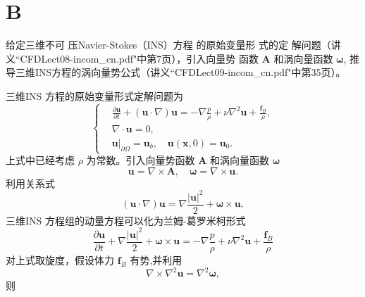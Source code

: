 \documentclass[12pt]{article}
\begin{document}
\section{B}

给定三维不可 压Navier-Stokes（INS）方程 的原始变量形 式的定
解问题（讲义“CFDLect08-incom_cn.pdf"中第7页），引入向量势
函数 $\bm{A}$ 和涡向量函数 $\bm{\omega}$, 推导三维INS方程的涡向量势公式（讲义“CFDLect09-incom_cn.pdf"中第35页）。

三维INS 方程的原始变量形式定解问题为
\begin{equation}
	\left\{\begin{aligned}
		 & \frac{\partial \bm{u}}{\partial t}+(\bm{u} \cdot \nabla) \bm{u}=-\nabla \frac{p}{\rho}+\nu \nabla^{2} \bm{u}+\frac{\bm{f}_{B}}{\rho}, \\
		 & \nabla \cdot \bm{u}=0,                                                                                                                \\
		 & \left.\bm{u}\right|_{\partial \Omega}=\bm{u}_{b}, \quad \bm{u}(\bm{x}, 0)=\bm{u}_{0} .
	\end{aligned}\right.
\end{equation}
上式中已经考虑 $\rho$ 为常数。引入向量势函数 $\bm{A}$ 和涡向量函数 $\bm{\omega}$
\begin{equation}
	\bm{u}=\nabla \times \bm{A}, \quad \bm{\omega}=\nabla \times \bm{u}.
\end{equation}
利用关系式
\begin{equation}
	(\bm{u} \cdot \nabla) \bm{u}=\nabla \frac{|\bm{u}|^{2}}{2}+\bm{\omega} \times \bm{u},
\end{equation}
三维INS 方程组的动量方程可以化为兰姆-葛罗米柯形式
\begin{equation}
	\frac{\partial \bm{u}}{\partial t}+\nabla \frac{|\bm{u}|^{2}}{2}+\bm{\omega} \times \bm{u}=-\nabla \frac{p}{\rho}+\nu \nabla^{2} \bm{u}+\frac{\bm{f}_{B}}{\rho}
\end{equation}
对上式取旋度，假设体力 $\bm{f}_{B}$ 有势,并利用
\begin{equation}
	\nabla \times \nabla^{2} \bm{u}=\nabla^{2} \bm{\omega},
\end{equation}
则
\end{document}
